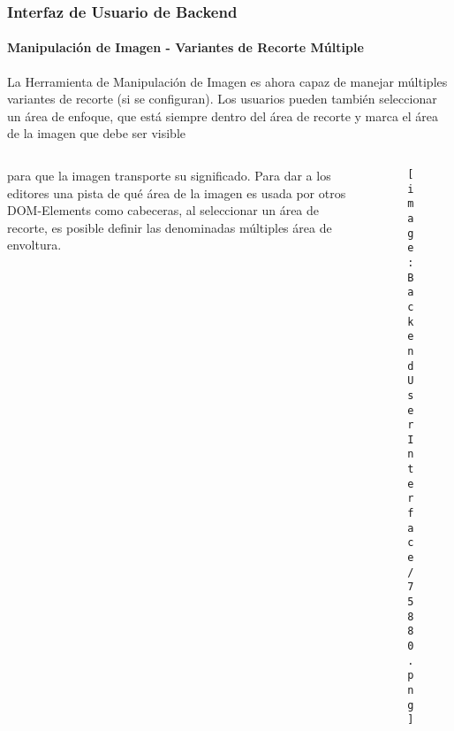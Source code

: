 \begin{frame}[fragile]
	\frametitle{Interfaz de Usuario de Backend}
	\framesubtitle{Manipulación de Imagen - Variantes de Recorte Múltiple}

	La Herramienta de Manipulación de Imagen es ahora capaz de manejar múltiples variantes de recorte (si se configuran).
	Los usuarios pueden también seleccionar un área de enfoque, que está siempre dentro del área de recorte y marca el área
	de la imagen que debe ser visible %

	\begin{columns}[T]
		\begin{column}{.35\textwidth}
			para que la imagen transporte su significado.
			Para dar a los editores una pista de qué área de la imagen es usada por otros DOM-Elements como cabeceras,
			al seleccionar un área de recorte, es posible definir las denominadas múltiples área de envoltura.
		\end{column}

		\begin{column}{.65\textwidth}
			\begin{figure}\vspace*{-0.6cm}
				\texttt{[image: BackendUserInterface/75880.png]}
			\end{figure}
		\end{column}
	\end{columns}

\end{frame}

